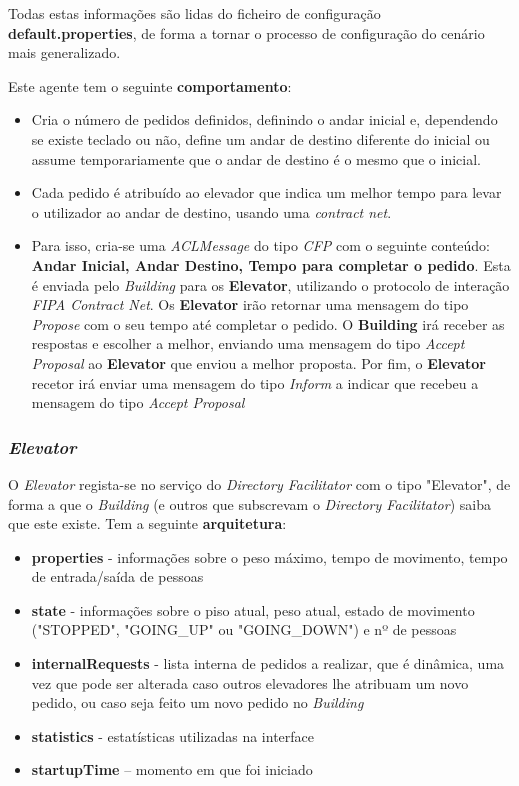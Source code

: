 \documentclass[a4paper]{article}
\begin{document}
Todas estas informações são lidas do ficheiro de configuração \textbf{default.properties}, de forma a tornar o processo de configuração do cenário mais generalizado.

Este agente tem o seguinte \textbf{comportamento}:

\begin{itemize}
\item Cria o número de pedidos definidos, definindo o andar inicial e, dependendo se existe teclado ou não, define um andar de destino diferente do inicial ou assume temporariamente que o andar de destino é o mesmo que o inicial. 
\item Cada pedido é atribuído ao elevador que indica um melhor tempo para levar o utilizador ao andar de destino, usando uma \textit{contract net}. 
\item Para isso, cria-se uma \textit{ACLMessage} do tipo \textit{CFP} com o seguinte conteúdo: \textbf{Andar Inicial, Andar Destino, Tempo para completar o pedido}. Esta é enviada pelo \textit{Building} para os \textbf{Elevator}, utilizando o protocolo de interação \textit{FIPA Contract Net}. Os \textbf{Elevator} irão retornar uma mensagem do tipo \textit{Propose} com o seu tempo até completar o pedido. O \textbf{Building} irá receber as respostas e escolher a melhor, enviando uma mensagem do tipo \textit{Accept Proposal} ao \textbf{Elevator} que enviou a melhor proposta. Por fim, o \textbf{Elevator} recetor irá enviar uma mensagem do tipo \textit{Inform} a indicar que recebeu a mensagem do tipo \textit{Accept Proposal}\end{itemize}

\subsubsection {\textit{Elevator}}

O \textit{Elevator} regista-se no serviço do \textit{Directory Facilitator} com o tipo "Elevator", de forma a que o \textit{Building} (e outros que subscrevam o \textit{Directory Facilitator}) saiba que este existe. Tem a seguinte \textbf{arquitetura}:

\begin{itemize}
\item \textbf{properties} -  informações sobre o peso máximo, tempo de movimento, tempo de entrada/saída de pessoas
\item \textbf{state} - informações sobre o piso atual, peso atual, estado de movimento ("STOPPED", "GOING\_UP" ou "GOING\_DOWN") e nº de pessoas
\item \textbf{internalRequests} - lista interna de pedidos a realizar, que é dinâmica, uma vez que pode ser alterada caso outros elevadores lhe atribuam um novo pedido, ou caso seja feito um novo pedido no \textit{Building}
\item \textbf{statistics} - estatísticas utilizadas na interface
\item \textbf{startupTime} – momento em que foi iniciado
\end{itemize}
\end{document}

